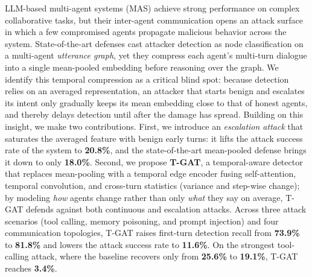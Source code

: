 LLM-based multi-agent systems (MAS) achieve strong performance on complex
collaborative tasks, but their inter-agent communication opens an attack surface
in which a few compromised agents propagate malicious behavior across the system.
State-of-the-art defenses cast attacker detection as node classification on a
multi-agent \emph{utterance graph}, yet they compress each agent's multi-turn
dialogue into a single mean-pooled embedding before reasoning over the graph.
We identify this temporal compression as a critical blind spot: because detection
relies on an averaged representation, an attacker that starts benign and escalates
its intent only gradually keeps its mean embedding close to that of honest agents,
and thereby delays detection until after the damage has spread. Building on this
insight, we make two contributions. First, we introduce an \emph{escalation
attack} that saturates the averaged feature with benign early turns: it lifts the
attack success rate of the system to \textbf{20.8\%}, and the state-of-the-art
mean-pooled defense brings it down to only \textbf{18.0\%}. Second, we propose
\textbf{T-GAT}, a temporal-aware detector that replaces mean-pooling with a
temporal edge encoder fusing self-attention, temporal convolution, and cross-turn
statistics (variance and step-wise change); by modeling \emph{how} agents change
rather than only \emph{what} they say on average, T-GAT defends against both
continuous and escalation attacks. Across three attack scenarios (tool calling,
memory poisoning, and prompt injection) and four communication topologies, T-GAT
raises first-turn detection recall from \textbf{73.9\%} to \textbf{81.8\%} and
lowers the attack success rate to \textbf{11.6\%}. On the strongest tool-calling
attack, where the baseline recovers only from \textbf{25.6\%} to \textbf{19.1\%},
T-GAT reaches \textbf{3.4\%}.
